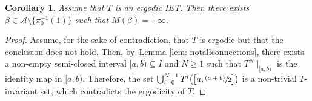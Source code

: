 \documentclass[10pt,a4paper]{article}
\newcommand{\psfrac}[2]{\sfrac{(#1)}{#2}}
\theoremstyle{plain}
\newtheorem{corollary}[theorem]{Corollary}
\theoremstyle{definition}
\begin{document}
\begin{corollary}\label{cor: existenceofinfiniteorbit}
Assume that $T$ is an ergodic IET. Then there exists {$\beta \in\mathcal A \setminus \{\pi_0^{-1}(1)\}$ such that $M(\beta) = +\infty$. }
\end{corollary}

\begin{proof}
Assume, for the sake of contradiction, that $T$ is ergodic but that the conclusion does not hold. Then, by~Lemma \ref{lem: notallconnections}, there exists a non-empty semi-closed interval $[a, b) \subseteq I$ and $N \geq 1$ such that $T^N\mid_{[a, b)}$ is the identity map in $[a, b)$. Therefore, the set $\bigcup_{i = 0}^{N - 1} T^i\big( \big[a, \psfrac{a + b}{2}\big]\big)$ is a non-trivial $T$-invariant set, which contradicts the ergodicity of $T$.
\end{proof}
\end{document}
